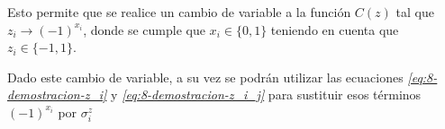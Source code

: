 Esto permite que se realice un cambio de variable a la función $C(z)$ tal que $z_i \rightarrow {(-1)}^{x_i}$, donde se cumple que $x_i \in \{0, 1\}$ teniendo en cuenta que $z_i \in \{-1, 1\}$.

Dado este cambio de variable, a su vez se podrán utilizar las ecuaciones \textit{\ref{eq:8-demostracion-z_i}} y \textit{\ref{eq:8-demostracion-z_i_j}} para sustituir esos términos ${(-1)}^{x_i}$ por $\sigma^z_i$


